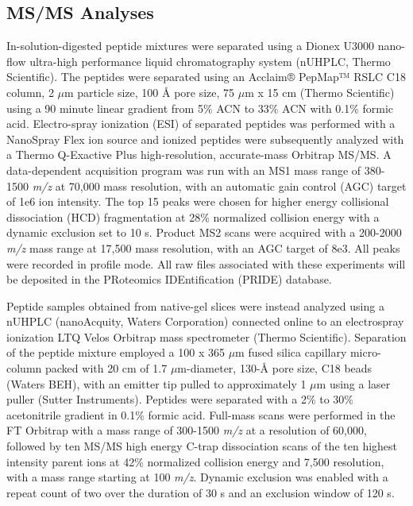 \subsection{MS/MS Analyses}
In-solution-digested peptide mixtures were separated using a Dionex U3000 nano-flow ultra-high performance liquid chromatography system (nUHPLC, Thermo Scientific). The peptides were separated using an Acclaim® PepMap™ RSLC C18 column, 2 $\mu$m particle size, 100 Å pore size, 75 $\mu$m x 15 cm (Thermo Scientific) using a 90 minute linear gradient from 5\% ACN to 33\% ACN with 0.1\% formic acid. Electro-spray ionization (ESI) of separated peptides was performed with a NanoSpray Flex ion source and ionized peptides were subsequently analyzed with a Thermo Q-Exactive Plus high-resolution, accurate-mass Orbitrap MS/MS. A data-dependent acquisition program was run with an MS1 mass range of 380-1500 \textit{m/z} at 70,000 mass resolution, with an automatic gain control (AGC) target of 1e6 ion intensity. The top 15 peaks were chosen for higher energy collisional dissociation (HCD) fragmentation at 28\% normalized collision energy with a dynamic exclusion set to 10 s. Product MS2 scans were acquired with a 200-2000 \textit{m/z} mass range at 17,500 mass resolution, with an AGC target of 8e3. All peaks were recorded in profile mode. All raw files associated with these experiments will be deposited in the PRoteomics IDEntification (PRIDE) database.

Peptide samples obtained from native-gel slices were instead analyzed using a nUHPLC (nanoAcquity, Waters Corporation) connected online to an electrospray ionization LTQ Velos Orbitrap mass spectrometer (Thermo Scientific).  Separation of the peptide mixture employed a 100 x 365 $\mu$m fused silica capillary micro-column packed with 20 cm of 1.7 $\mu$m-diameter, 130-Å pore size, C18 beads (Waters BEH), with an emitter tip pulled to approximately 1 $\mu$m using a laser puller (Sutter Instruments).  Peptides were separated with a 2\% to 30\% acetonitrile gradient in 0.1\% formic acid.  Full-mass scans were performed in the FT Orbitrap with a mass range of 300-1500 \textit{m/z} at a resolution of 60,000, followed by ten MS/MS high energy C-trap dissociation scans of the ten highest intensity parent ions at 42\% normalized collision energy and 7,500 resolution, with a mass range starting at 100 \textit{m/z}.  Dynamic exclusion was enabled with a repeat count of two over the duration of 30 s and an exclusion window of 120 s.
